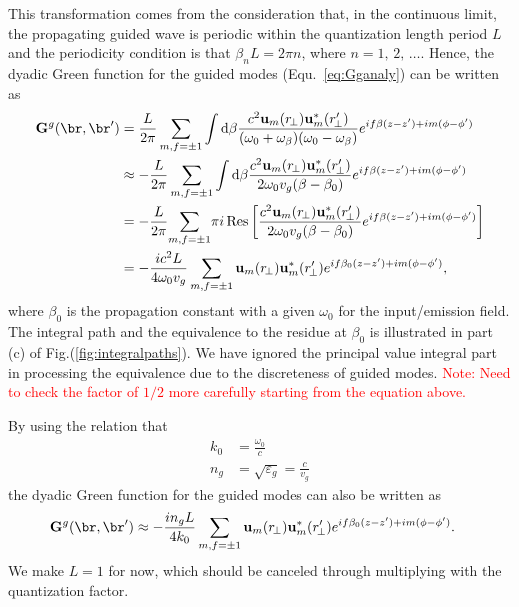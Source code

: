 \documentclass[]{report}
\begin{document}
This  transformation comes from the consideration that, in the continuous limit, the propagating guided wave is periodic within the quantization length period $ L $ and the periodicity condition is that $ \beta_n L=2\pi n $, where $ n=1,\,2,\,\ldots $. Hence, the dyadic Green function for the guided modes (Equ.~\eqref{eq:Gganaly}) can be written as
\begin{align}
\mathbf{G}^g(\br,\br') &= \frac{L}{2\pi}\sum_{m,f=\pm 1}\int \mathrm{d}\beta \frac{c^2\mathbf{u}_{m}(r\!_\perp)\mathbf{u}^*_{m}(r_{\!\perp}^\prime)}{(\omega_0+\omega_\beta)(\omega_0-\omega_\beta)}e^{if\beta(z-z')+im(\phi-\phi')}\\
&\approx -\frac{L}{2\pi}\sum_{m,f=\pm 1}\int \mathrm{d}\beta \frac{c^2\mathbf{u}_{m}(r\!_\perp)\mathbf{u}^*_{m}(r_{\!\perp}^\prime)}{2\omega_0v_g(\beta-\beta_0)}e^{if\beta(z-z')+im(\phi-\phi')}\label{eq:eigGFintegral}\\
&= -\frac{L}{2\pi} \! \sum_{m,f=\pm 1}\! \pi i\, \mathrm{Res}\left[ \frac{c^2\mathbf{u}_{m}(r\!_\perp)\mathbf{u}^*_{m}(r_{\!\perp}^\prime)}{2\omega_0v_g(\beta-\beta_0)}e^{if\beta(z-z')+im(\phi-\phi')}\right]\\
&= -\frac{ic^2L}{4\omega_0v_g} \sum_{m,f=\pm 1} \mathbf{u}_{m}(r\!_\perp)\mathbf{u}^*_{m}(r_{\!\perp}^\prime)e^{if\beta_0(z-z')+im(\phi-\phi')},
\end{align}
where $ \beta_0 $ is the propagation constant with a given $ \omega_0 $ for the input/emission field. The integral path and the equivalence to the residue at $ \beta_0 $ is illustrated in part (c) of Fig.(\ref{fig:integralpaths}). We have ignored the principal value integral part in processing the equivalence due to the discreteness of guided modes. \textcolor{red}{Note: Need to check the factor of $ 1/2 $ more carefully starting from the equation above.} 

By using the relation that 
\begin{align}
k_0 &=\frac{\omega_0}{c}\\
n_g&=\sqrt{\varepsilon_g}= \frac{c}{v_g}
\end{align}
the dyadic Green function for the guided modes can also be written as
\begin{align}
\mathbf{G}^g(\br,\br') &\approx -\frac{in_gL}{4k_0} \sum_{m,f=\pm 1} \mathbf{u}_{m}(r\!_\perp)\mathbf{u}^*_{m}(r_{\!\perp}^\prime)e^{if\beta_0(z-z')+im(\phi-\phi')}.
\end{align}
We make $ L=1 $ for now, which should be canceled through multiplying with the quantization factor. 
\end{document}
